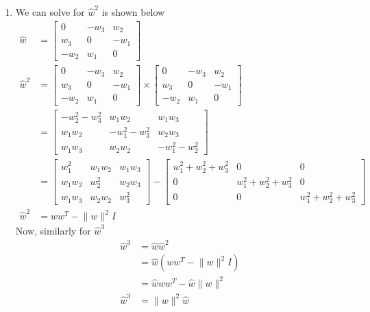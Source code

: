 \documentclass[10pt]{article}
\begin{document}
\begin{enumerate}
\begin{enumerate}
\item We can solve for $\hat{w}^2$ is shown below
\begin{align*} \hat{w} &= \begin{bmatrix} 0 & -w_3 & w_2 \\ w_3 & 0 & -w_1 \\ -w_2 & w_1 & 0 \end{bmatrix} \\
\hat{w}^2 &=  \begin{bmatrix} 0 & -w_3 & w_2 \\ w_3 & 0 & -w_1 \\ -w_2 & w_1 & 0 \end{bmatrix} \times  \begin{bmatrix} 0 & -w_3 & w_2 \\ w_3 & 0 & -w_1 \\ -w_2 & w_1 & 0 \end{bmatrix} \\
&=  \begin{bmatrix} -w_2^2-w_3^2 & w_1w_2 & w_1w_3 \\ w_1w_2 & -w_1^2-w_3^2 & w_2w_3 \\ w_1w_3 & w_2w_2 & -w_1^2-w_2^2 \end{bmatrix} \\
&= \begin{bmatrix} w_1^2 & w_1w_2 & w_1w_3 \\ w_1w_2 & w_2^2 & w_2w_3 \\ w_1w_3 & w_2w_2 & w_3^2 \end{bmatrix} - \begin{bmatrix} w_1^2 +w_2^2 + w_3^2 & 0 & 0 \\ 0 & w_1^2 + w_2^2 +w_3^2 & 0 \\ 0 & 0 & w_1^2 + w_2^2+w_3^2 \end{bmatrix} \\
\hat{w}^2 &= ww^T - \lVert w \rVert^2 I
\end{align*}
Now, similarly for $\hat{w}^3$
\begin{align*}
\hat{w}^3 &= \hat{w} \hat{w}^2 \\
&= \hat{w} (ww^T - \lVert w \rVert^2 I) \\
&= \hat{w}ww^T - \hat{w} \lVert w \rVert ^2 \\
\hat{w}^3 &= \lVert w \rVert^2 \hat{w}
\end{align*}


\end{enumerate}
\end{enumerate}
\end{document}
